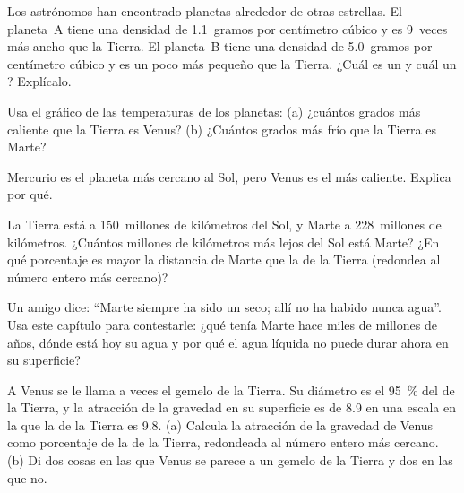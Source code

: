 \begin{exercise}[$\star\star$]\label{exo:g6:earth-a-planet:7}
Los astrónomos han encontrado planetas alrededor de otras estrellas. El
planeta~A tiene una densidad de 1.1~gramos por centímetro cúbico y es
9~veces más ancho que la Tierra. El planeta~B tiene una densidad de
5.0~gramos por centímetro cúbico y es un poco más pequeño que la Tierra.
¿Cuál es un  y cuál un ? Explícalo.
\end{exercise}

\begin{exercise}[$\star\star$]\label{exo:g6:earth-a-planet:8}
Usa el gráfico de las temperaturas de los planetas: (a) ¿cuántos grados
más caliente que la Tierra es Venus? (b) ¿Cuántos grados más frío que la
Tierra es Marte?
\end{exercise}

\begin{exercise}[$\star\star$]\label{exo:g6:earth-a-planet:9}
Mercurio es el planeta más cercano al Sol, pero Venus es el más caliente.
Explica por qué.
\end{exercise}

\begin{exercise}[$\star\star$]\label{exo:g6:earth-a-planet:10}
La Tierra está a 150~millones de kilómetros del Sol, y Marte a
228~millones de kilómetros. ¿Cuántos millones de kilómetros más lejos del
Sol está Marte? ¿En qué porcentaje es mayor la distancia de Marte que la de
la Tierra (redondea al número entero más cercano)?
\end{exercise}

\begin{exercise}[$\star\star\star$]\label{exo:g6:earth-a-planet:11}
Un amigo dice: ``Marte siempre ha sido un  seco; allí no ha habido
nunca agua''. Usa este capítulo para contestarle: ¿qué tenía Marte hace
miles de millones de años, dónde está hoy su agua y por qué el agua
líquida no puede durar ahora en su superficie?
\end{exercise}

\begin{exercise}[$\star\star\star$]\label{exo:g6:earth-a-planet:12}
A Venus se le llama a veces el gemelo de la Tierra. Su diámetro es el
95~\% del de la Tierra, y la atracción de la gravedad en su superficie es
de 8.9 en una escala en la que la de la Tierra es 9.8. (a) Calcula la
atracción de la gravedad de Venus como porcentaje de la de la Tierra,
redondeada al número entero más cercano. (b) Di dos cosas en las que Venus
se parece a un gemelo de la Tierra y dos en las que no.
\end{exercise}

